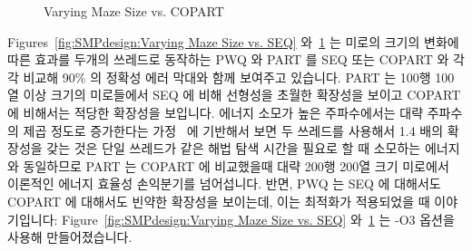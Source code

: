 \begin{figure}[tb]
\begin{center}
\end{center}
\caption{Varying Maze Size vs. COPART}
\label{fig:SMPdesign:Varying Maze Size vs. COPART}
\end{figure}

Figures~\ref{fig:SMPdesign:Varying Maze Size vs. SEQ}
와~\ref{fig:SMPdesign:Varying Maze Size vs. COPART} 는 미로의 크기의 변화에
따른 효과를 두개의 쓰레드로 동작하는 PWQ 와 PART 를 SEQ 또는 COPART 와 각각
비교해 90\% 의 정확성 에러 막대와 함께 보여주고 있습니다.
PART 는 100행 100열 이상 크기의 미로들에서 SEQ 에 비해 선형성을 초월한 확장성을
보이고 COPART 에 비해서는 적당한 확장성을 보입니다.
에너지 소모가 높은 주파수에서는 대략 주파수의 제곱 정도로 증가한다는
가정~\cite{TrevorMudge2000Power} 에 기반해서 보면 두 쓰레드를 사용해서 1.4 배의
확장성을 갖는 것은 단일 쓰레드가 같은 해법 탐색 시간을 필요로 할 때 소모하는
에너지와 동일하므로 PART 는 COPART 에 비교했을때 대략 200행 200열 크기 미로에서
이론적인 에너지 효율성 손익분기를 넘어섭니다.
반면, PWQ 는 SEQ 에 대해서도 COPART 에 대해서도 빈약한 확장성을 보이는데, 이는
최적화가 적용되었을 때 이야기입니다: Figure~\ref{fig:SMPdesign:Varying Maze
Size vs. SEQ}
와~\ref{fig:SMPdesign:Varying Maze Size vs. COPART} 는 -O3 옵션을 사용해
만들어졌습니다.
\iffalse

